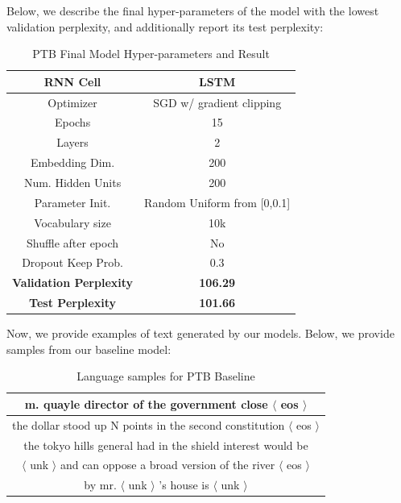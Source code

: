 \documentclass[a4paper]{article}
\begin{document}
Below, we describe the final hyper-parameters of the model with the lowest validation perplexity, and additionally report its test perplexity:
\begin{table}[H]
\centering
\begin{tabular}{|c | c|} 
 \hline
RNN Cell & LSTM\\ \hline
Optimizer & SGD w/ gradient clipping \\ \hline
Epochs & 15\\ \hline
Layers & 2\\ \hline
Embedding Dim. & 200\\ \hline
Num. Hidden Units & 200\\ \hline
Parameter Init. & Random Uniform from [0,0.1]\\ \hline
Vocabulary size & 10k\\ \hline
Shuffle after epoch & No \\ \hline
Dropout Keep Prob. & 0.3 \\ \hline
\textbf{Validation Perplexity} &\textbf{106.29} \\ \hline
\textbf{Test Perplexity} &\textbf{101.66} \\ \hline
\end{tabular}
\caption{PTB Final Model Hyper-parameters and Result}
\label{table:1}
\end{table}

Now, we provide examples of text generated by our models. Below, we provide samples from our baseline model:
\begin{table}[h]
\centering
\begin{tabular}{|c|} \hline
m. quayle director of the government close $\langle$ eos $\rangle$ \\ \hline
the dollar stood up N points in the second constitution $\langle$ eos $\rangle$ \\ \hline 
the tokyo hills general had in the shield interest would be \\ $\langle$ unk $\rangle$ and can oppose a broad version of the river $\langle$ eos $\rangle$ \\ \hline
by mr. $\langle$ unk $\rangle$ 's house is $\langle$ unk $\rangle$  \\ \hline
\end{tabular}
\caption{Language samples for PTB Baseline}
\label{table:1}
\end{table}
\end{document}

